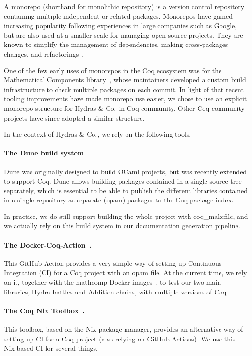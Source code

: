 \documentclass{easychair}
\newcommand{\community}{Coq-community\xspace}
\newcommand{\Hydras}{Hydras \& Co$\text.$\xspace}
\begin{document}
A monorepo (shorthand for monolithic repository) is a version control repository containing multiple independent or related packages.
%
Monorepos have gained increasing popularity following experiences in large companies such as Google, but are also used at a smaller scale for managing open source projects.
%
They are known to simplify the management of dependencies, making cross-packages changes, and refactorings~\cite{brito2018monorepos}.

%
One of the few early uses of monorepos in the Coq ecosystem was for the Mathematical Components library~\cite{MCB}, whose maintainers developed a custom build infrastructure to check multiple packages on each commit.
%
In light of that recent tooling improvements have made monorepo use easier, we chose to use an explicit monorepo structure for \Hydras in \community. Other \community projects have since adopted a similar structure.

In the context of \Hydras, we rely on the following tools.

\paragraph{The Dune build system~\cite{dune}.}
Dune was originally designed to build OCaml projects, but was recently extended to support Coq. Dune allows building packages contained in a single source tree separately, which is essential to be able to publish the different libraries contained in a single repository as separate (opam) packages to the Coq package index.

In practice, we do still support building the whole project with coq\_makefile, and we actually rely on this build system in our documentation generation pipeline.

\paragraph{The Docker-Coq-Action~\cite{martindorel2020dockercoq}.}
This GitHub Action provides a very simple way of setting up Continuous Integration (CI) for a Coq project with an opam file.
%
At the current time, we rely on it, together with the mathcomp Docker images~\cite{mathcompdocker}, to test our two main libraries, Hydra-battles and Addition-chains, with multiple versions of Coq.

\paragraph{The Coq Nix Toolbox~\cite{cohen:hal-03366644}.}
This toolbox, based on the Nix package manager, provides an alternative way of setting up CI for a Coq project (also relying on GitHub Actions).
%
We use this Nix-based CI for several things.
\end{document}
